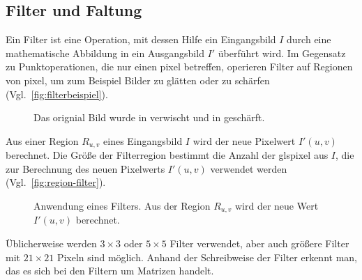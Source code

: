 \subsection{Filter und Faltung} %
\label{sub:filter}
Ein Filter ist eine Operation, mit dessen Hilfe ein Eingangsbild $I$ durch eine mathematische Abbildung in ein
 Ausgangsbild $I'$ überführt wird. Im Gegensatz zu Punktoperationen, die nur einen \gls{pixel} betreffen, operieren
 Filter auf Regionen von \gls{pixel}, um zum Beispiel Bilder zu glätten oder zu schärfen
 (Vgl.~\autoref{fig:filterbeispiel}).
\begin{figure}[!ht]
	\centering
	\caption{Das orignial Bild  wurde in
	  verwischt und in  geschärft.}
	\label{fig:filterbeispiel}
\end{figure}

Aus einer Region $R_{u,v}$ eines Eingangsbild $I$ wird der neue Pixelwert $I'(u,v)$ berechnet. Die Größe der
 Filterregion bestimmt die Anzahl der gls{pixel} aus $I$, die zur Berechnung des neuen Pixelwerts $I'(u,v)$ verwendet
 werden (Vgl.~\autoref{fig:region-filter}).
\begin{figure}[!ht]
	\centering
	
	\caption{Anwendung eines Filters. Aus der Region $R_{u,v}$ wird der neue Wert $I'(u,v)$ berechnet.}
	\label{fig:region-filter}
\end{figure}
Üblicherweise werden $3 \times 3$ oder $5 \times 5$ Filter verwendet, aber auch größere Filter mit $21 \times 21$
 Pixeln sind möglich. Anhand der Schreibweise der Filter erkennt man, das es sich bei den Filtern um Matrizen handelt.

